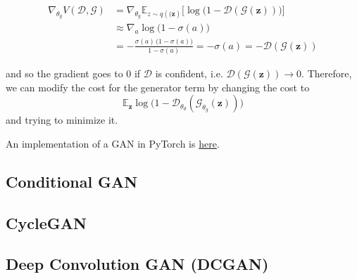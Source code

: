   \begin{align*} 
    \nabla_{\theta_g} V(\mathcal{D}, \mathcal{G}) & = \nabla_{\theta_g} \mathbb{E}_{z \sim q(\mathbf(\mathbf{z})} \big[ \log \big( 1 - \mathcal{D}(\mathcal{G}(\mathbf{z}))\big) \big] \\
                                                  & \approx \nabla_a \log \big( 1 - \sigma(a)\big) \\
                                                  & = - \frac{\sigma(a) \, \big( 1 - \sigma(a)\big)}{1 - \sigma(a)} = - \sigma(a) = - \mathcal{D}(\mathcal{G}(\mathbf{z})) 
  \end{align*} 

  and so the gradient goes to $0$ if $\mathcal{D}$ is confident, i.e. $\mathcal{D}(\mathcal{G}(\mathbf{z})) \rightarrow 0$. Therefore, we can modify the cost for the generator term by changing the cost to 
  \begin{equation}
    \mathbb{E}_{\mathbf{z}} \log \big( 1 - \mathcal{D}_{\theta_d} ( \mathcal{G}_{\theta_g} (\mathbf{z}))\big)
  \end{equation}
  and trying to minimize it. 


  \begin{theorem}[Convergence]
    
  \end{theorem}

  \begin{algo}
    An implementation of a GAN in PyTorch is \href{code/gan.html}{here}. 
  \end{algo}


\subsection{Conditional GAN} 

\subsection{CycleGAN}

\subsection{Deep Convolution GAN (DCGAN)} 

